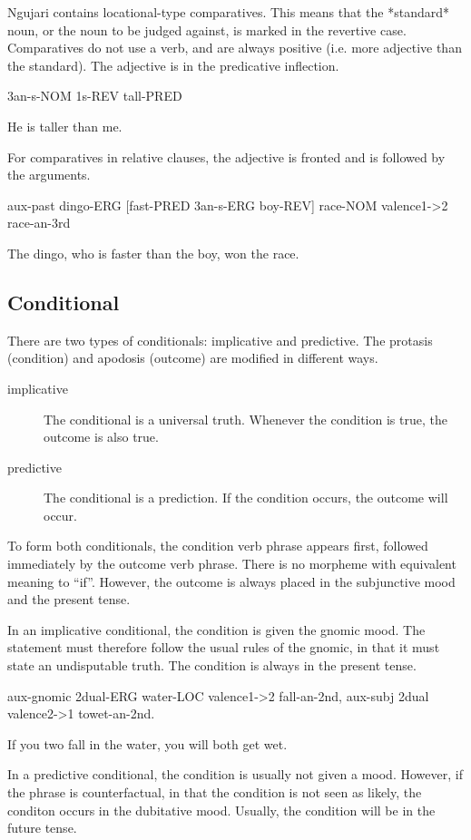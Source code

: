Ngujari contains locational-type comparatives. This means that the *standard*
noun, or the noun to be judged against, is marked in the revertive case.
Comparatives do not use a verb, and are always positive (i.e. more adjective
than the standard). The adjective is in the predicative inflection.

3an-s-NOM 1s-REV tall-PRED

He is taller than me.

For comparatives in relative clauses, the adjective is fronted and is followed
by the arguments.

aux-past dingo-ERG [fast-PRED 3an-s-ERG boy-REV] race-NOM valence1->2
race-an-3rd

The dingo, who is faster than the boy, won the race.

\subsection{Conditional}

There are two types of conditionals: implicative and predictive. The protasis
(condition) and apodosis (outcome) are modified in different ways.

\begin{description}
\item[implicative] The conditional is a universal truth. Whenever the condition
  is true, the outcome is also true.
\item[predictive] The conditional is a prediction. If the condition occurs, the
  outcome will occur.
\end{description}

To form both conditionals, the condition verb phrase appears first, followed
immediately by the outcome verb phrase. There is no morpheme with equivalent
meaning to ``if''. However, the outcome is always placed in the subjunctive
mood and the present tense.

In an implicative conditional, the condition is given the gnomic mood. The
statement must therefore follow the usual rules of the gnomic, in that it must
state an undisputable truth. The condition is always in the present tense.

aux-gnomic 2dual-ERG water-LOC valence1->2 fall-an-2nd, aux-subj 2dual
valence2->1 towet-an-2nd.

If you two fall in the water, you will both get wet.

In a predictive conditional, the condition is usually not given a mood.
However, if the phrase is counterfactual, in that the condition is not seen as
likely, the conditon occurs in the dubitative mood. Usually, the condition
will be in the future tense.

